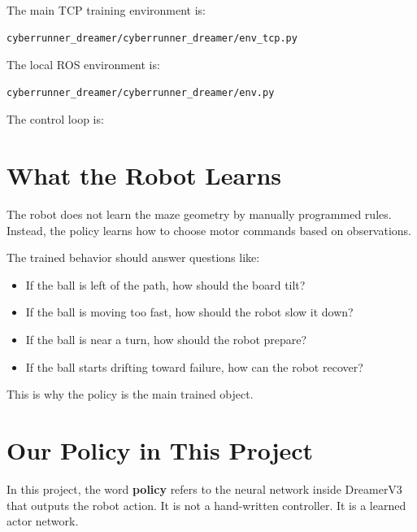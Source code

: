 \documentclass[11pt]{article}
\begin{document}
The main TCP training environment is:

\begin{lstlisting}
cyberrunner_dreamer/cyberrunner_dreamer/env_tcp.py
\end{lstlisting}

The local ROS environment is:

\begin{lstlisting}
cyberrunner_dreamer/cyberrunner_dreamer/env.py
\end{lstlisting}

The control loop is:

\begin{center}
\end{center}

\section{What the Robot Learns}

The robot does not learn the maze geometry by manually programmed rules. Instead, the policy learns how to choose motor commands based on observations.

The trained behavior should answer questions like:

\begin{itemize}[leftmargin=*]
  \item If the ball is left of the path, how should the board tilt?
  \item If the ball is moving too fast, how should the robot slow it down?
  \item If the ball is near a turn, how should the robot prepare?
  \item If the ball starts drifting toward failure, how can the robot recover?
\end{itemize}

This is why the policy is the main trained object.

\section{Our Policy in This Project}

In this project, the word \textbf{policy} refers to the neural network inside DreamerV3 that outputs the robot action. It is not a hand-written controller. It is a learned actor network.
\end{document}
